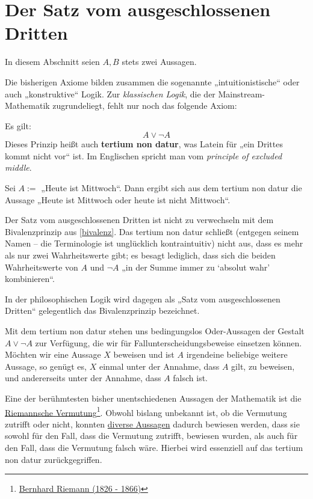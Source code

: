 \section{Der Satz vom ausgeschlossenen Dritten}


In diesem Abschnitt seien $A,B$ stets zwei Aussagen.

Die bisherigen Axiome bilden zusammen die sogenannte „intuitionistische“ oder auch „konstruktive“ Logik. Zur \emph{klassischen Logik}, die der Mainstream-Mathematik zugrundeliegt, fehlt nur noch das folgende Axiom:


\begin{axiom} \label{excludedmiddle}  
    Es gilt:
        \[ A\lor \neg A \]
    Dieses Prinzip heißt auch \textbf{tertium non datur}, was Latein für „ein Drittes kommt nicht vor“ ist. Im Englischen spricht man vom \emph{principle of excluded middle}.
\end{axiom}


\begin{bsp}
    Sei $A:=$ „Heute ist Mittwoch“. Dann ergibt sich aus dem tertium non datur die Aussage „Heute ist Mittwoch oder heute ist nicht Mittwoch“.
\end{bsp}


\begin{bem}
    Der Satz vom ausgeschlossenen Dritten ist nicht zu verwechseln mit dem Bivalenzprinzip aus \cref{bivalenz}. Das tertium non datur schließt (entgegen seinem Namen -- die Terminologie ist unglücklich kontraintuitiv) nicht aus, dass es mehr als nur zwei Wahrheitswerte gibt; es besagt lediglich, dass sich die beiden Wahrheitswerte von $A$ und $\neg A$ „in der Summe immer zu `absolut wahr' kombinieren“.
    
    In der philosophischen Logik wird dagegen als „Satz vom ausgeschlossenen Dritten“ gelegentlich das Bivalenzprinzip bezeichnet.
\end{bem}


\begin{bem}
    Mit dem tertium non datur stehen uns bedingungslos Oder-Aussagen der Gestalt $A\lor \neg A$ zur Verfügung, die wir für Fallunterscheidungsbeweise einsetzen können. Möchten wir eine Aussage $X$ beweisen und ist $A$ irgendeine beliebige weitere Aussage, so genügt es, $X$ einmal unter der Annahme, dass $A$ gilt, zu beweisen, und andererseits unter der Annahme, dass $A$ falsch ist.
    
    Eine der berühmtesten bisher unentschiedenen Aussagen der Mathematik ist die \href{https://de.wikipedia.org/wiki/Riemannsche_Vermutung}{Riemannsche Vermutung}\footnote{\href{https://de.wikipedia.org/wiki/Bernhard_Riemann}{Bernhard Riemann (1826 - 1866)}}. Obwohl bislang unbekannt ist, ob die Vermutung zutrifft oder nicht, konnten \href{https://en.wikipedia.org/wiki/Riemann_hypothesis#Excluded_middle}{diverse Aussagen} dadurch bewiesen werden, dass sie sowohl für den Fall, dass die Vermutung zutrifft, bewiesen wurden, als auch für den Fall, dass die Vermutung falsch wäre. Hierbei wird essenziell auf das tertium non datur zurückgegriffen.
\end{bem}


